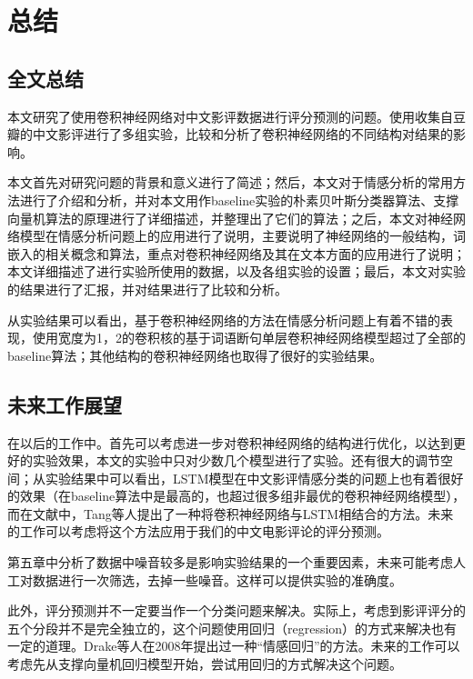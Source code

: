 \chapter{总结}

\section{全文总结}
本文研究了使用卷积神经网络对中文影评数据进行评分预测的问题。使用收集自豆瓣的中文影评进行了多组实验，比较和分析了卷积神经网络的不同结构对结果的影响。

本文首先对研究问题的背景和意义进行了简述；然后，本文对于情感分析的常用方法进行了介绍和分析，并对本文用作baseline实验的朴素贝叶斯分类器算法、支撑向量机算法的原理进行了详细描述，并整理出了它们的算法；之后，本文对神经网络模型在情感分析问题上的应用进行了说明，主要说明了神经网络的一般结构，词嵌入的相关概念和算法，重点对卷积神经网络及其在文本方面的应用进行了说明；本文详细描述了进行实验所使用的数据，以及各组实验的设置；最后，本文对实验的结果进行了汇报，并对结果进行了比较和分析。

从实验结果可以看出，基于卷积神经网络的方法在情感分析问题上有着不错的表现，使用宽度为1，2的卷积核的基于词语断句单层卷积神经网络模型超过了全部的baseline算法；其他结构的卷积神经网络也取得了很好的实验结果。

\section{未来工作展望}
在以后的工作中。首先可以考虑进一步对卷积神经网络的结构进行优化，以达到更好的实验效果，本文的实验中只对少数几个模型进行了实验。还有很大的调节空间；从实验结果中可以看出，LSTM模型在中文影评情感分类的问题上也有着很好的效果（在baseline算法中是最高的，也超过很多组非最优的卷积神经网络模型），而在文献\cite{tang2015document}中，Tang等人提出了一种将卷积神经网络与LSTM相结合的方法。未来的工作可以考虑将这个方法应用于我们的中文电影评论的评分预测。

第五章中分析了数据中噪音较多是影响实验结果的一个重要因素，未来可能考虑人工对数据进行一次筛选，去掉一些噪音。这样可以提供实验的准确度。

此外，评分预测并不一定要当作一个分类问题来解决。实际上，考虑到影评评分的五个分段并不是完全独立的，这个问题使用回归（regression）的方式来解决也有一定的道理。Drake等人在2008年提出过一种“情感回归”的方法\cite{drake2008sentiment}。未来的工作可以考虑先从支撑向量机回归模型开始，尝试用回归的方式解决这个问题。

